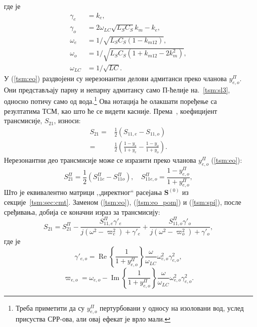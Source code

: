 где је
\begin{equation}
\begin{aligned}
\gamma_e &= k_e, \\
\gamma_o &= 2\omega_{LC}\sqrt{L_S C_S} k_m - k_e, \\
\omega_e &= 1/ \sqrt{L_S C_S(1-k_{m12})}, \\
\omega_o &= 1/ \sqrt{L_S C_S(1+k_{m12}-2k_m^2)}, \\
\omega_{LC} &= 1/ \sqrt{LC}.
\end{aligned}
\label{tsm:eo_pom}
\end{equation}
У (\ref{tsm:eo}) раздвојени су нерезонантни делови адмитанси преко чланова $y_{e,o}^\Pi$. Они представљају парну  и непарну адмитансу само П-ћелије на.~\ref{tsm:sl3}, односно потичу само од вода.\footnote{Треба приметити да су $y_{e,o}^\Pi$ пертурбовани у односу на изоловани вод, услед присуства СРР-ова, али овај ефекат је врло мали.} Ова нотација ће олакшати поређење са резултатима ТСМ, као што ће се видети касније. Према~\cite{hong}, коефицијент трансмисије, $S_{21}$, износи:
\begin{equation}
\begin{aligned}
S_{21} =& \frac{1}{2}(S_{11,e}-S_{11,o}) \\
=& \frac{1}{2}\left( \frac{1-y_e}{1+y_e}
- \frac{1-y_o}{1+y_o} \right).
\end{aligned}
\end{equation}
Нерезонантни део трансмисије може се изразити преко чланова $y_{e,o}^\Pi$ (\ref{tsm:eo}):
\begin{equation}
S_{21}^\Pi = \frac{1}{2} \left( S_{11e}^\Pi - S_{11o}^\Pi \right),\quad
S_{11e,o}^\Pi = \frac{1-y_{e,o}^\Pi}{1+y_{e,o}^\Pi},
\label{tsm:spi}\end{equation}
Што је еквивалентно матрици ,,директног`` расејања $\mathbf{S}^{(0)}$ из секције~\ref{tsm:sec:cmt}. Заменом (\ref{tsm:eo}), (\ref{tsm:eo_pom}) и (\ref{tsm:spi}), после сређивања, добија се коначни израз за трансмисију:
\begin{equation}
S_{21} = S_{21}^\Pi - \frac{S_{11,e}^\Pi\gamma'_e}{j(\omega^2-\varpi_e^2)+\gamma'_e} + \frac{S_{11,o}^\Pi\gamma'_o}{j(\omega^2-\varpi_o^2)+\gamma'_o},
\label{tsm:s21sm}\end{equation}
где је
\begin{equation}
\gamma'_{e,o} = \operatorname{Re}\left\{ \frac{1}{1+y_{e,o}^\Pi} \right\} \frac{\omega}{\omega_{LC}}\omega_{e,o}^2\gamma_{e,o}^2,
\label{tsm:gama}\end{equation}
\begin{equation}
\varpi_{e,o} = \omega_{e,o} - \operatorname{Im}\left\{ \frac{1}{1+y_{e,o}^\Pi} \right\} \frac{\omega}{\omega_{LC}}\omega_{e,o}^2\gamma_{e,o}^2.
\label{tsm:omega}\end{equation}
